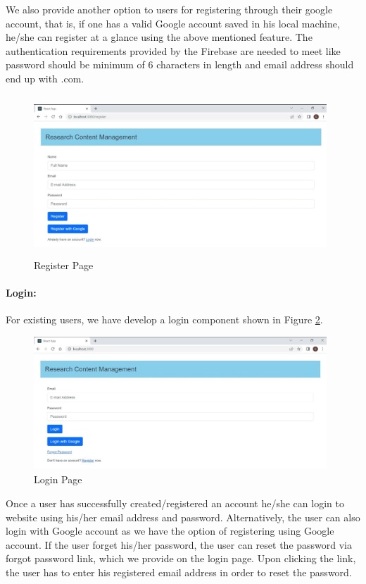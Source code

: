 We also provide another option to users for registering through their google account, that is, if one has a valid Google account saved in his local machine, he/she can register at a glance using the above mentioned feature. The authentication requirements provided by the Firebase are needed to meet like password should be minimum of 6 characters in length and email address should end up with .com. 
\begin{figure}[t]
	\centering
	\includegraphics[width=11cm,height=6cm]{./images/register.png}
	\vspace{-0.5cm}
	\caption{Register Page}
	\label{fig:register}
\end{figure}

\paragraph{\textbf{Login:}} For existing users, we have develop a login component shown in Figure \ref{fig:login}.
\begin{figure}[htbp]
	\centering
	\includegraphics[width=11cm,height=5cm]{./images/login.png}
	\vspace{-0.5cm}
	\caption{Login Page}
	\label{fig:login}
\end{figure}
 Once a user has successfully created/registered an account he/she can login to website using his/her email address and password.
 Alternatively, the user can also login with Google account as we have the option of registering using Google account. If the user forget his/her password, the user can reset the password via  forgot password link, which we provide on the login page. Upon clicking the link, the user has to enter his registered email address in order to reset the password. 

